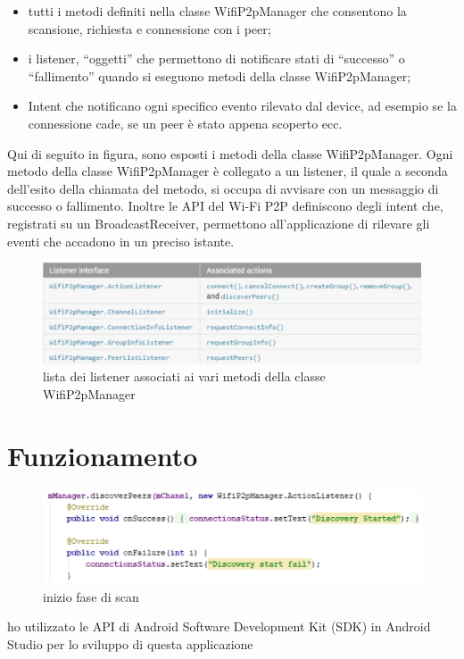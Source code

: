 \begin{itemize}
   \item tutti i metodi definiti nella classe WifiP2pManager che
   consentono la scansione,
   richiesta e connessione con i peer;
   \item i listener, “oggetti” che permettono di notificare
   stati di “successo” o
   “fallimento” quando si eseguono metodi della classe WifiP2pManager;
   \item Intent che notificano ogni
   specifico evento rilevato dal device, ad
   esempio se la connessione cade, se un peer è stato appena scoperto ecc.
\end{itemize}
Qui di seguito in figura, sono esposti i metodi della classe WifiP2pManager.
Ogni metodo della classe WifiP2pManager è collegato a un listener, il quale a
seconda dell’esito della chiamata del metodo, si occupa di avvisare con un
messaggio di successo o fallimento.
Inoltre le API del Wi-Fi P2P definiscono degli intent che, registrati su un
BroadcastReceiver, permettono all’applicazione di rilevare gli eventi che
accadono in un preciso istante.
\begin{figure}
   \centering
   \caption{lista dei listener associati ai vari metodi della classe WifiP2pManager}
   \includegraphics[width=1\columnwidth]{imgs/listenerwifip2pmanager.jpg}
\end{figure}




\section{Funzionamento}
\begin{figure}
   \centering
   \caption{inizio fase di scan}
   \includegraphics[width=1\columnwidth]{imgs/discoveryStart.png} %
\end{figure}
ho utilizzato le API di Android Software Development Kit (SDK)
in Android Studio \cite{ASD} per lo sviluppo di questa applicazione
